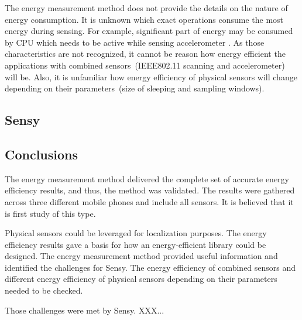 The energy measurement method does not provide the details on the nature of energy consumption. It is unknown which exact operations consume the most energy during sensing. For example, significant part of energy may be consumed by CPU which needs to be active while sensing accelerometer \cite{priyantha:littlerock}. As those characteristics are not recognized, it cannot be reason how energy efficient the applications with combined sensors\ (IEEE802.11 scanning and accelerometer) will be. Also, it is unfamiliar how energy efficiency of physical sensors will change depending on their parameters\ (size of sleeping and sampling windows).
						
\subsection{Sensy}
\subsection{Conclusions}
The energy measurement method delivered the complete set of accurate energy efficiency results, and thus, the method was validated. The results were gathered across three different mobile phones and include all sensors. It is believed that it is first study of this type. 

Physical sensors could be leveraged for localization purposes. The energy efficiency results gave a basis for how an energy-efficient library could be designed. The energy measurement method provided useful information and identified the challenges for Sensy. The energy efficiency of combined sensors and different energy efficiency of physical sensors depending on their parameters needed to be checked. 

Those challenges were met by Sensy. XXX...